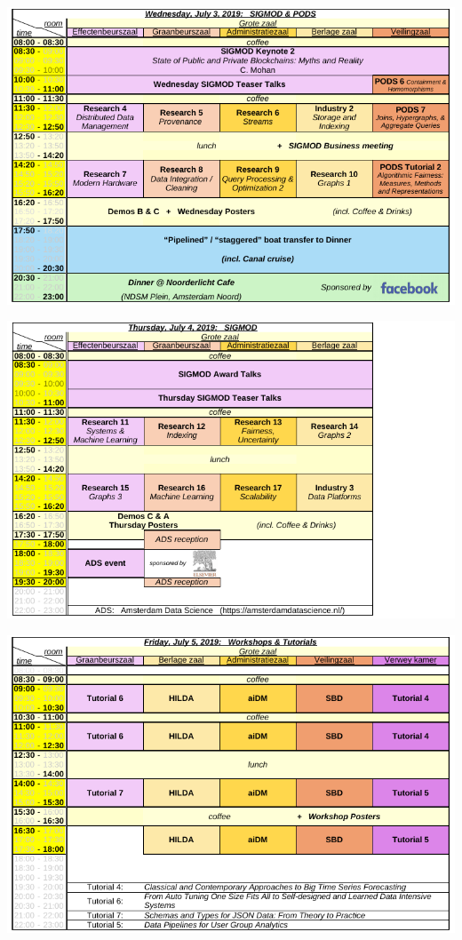 \begin{landscape}
\includegraphics{schedule/p4.pdf}

\includegraphics{schedule/p5.pdf}

\includegraphics{schedule/p6.pdf}

\end{landscape}